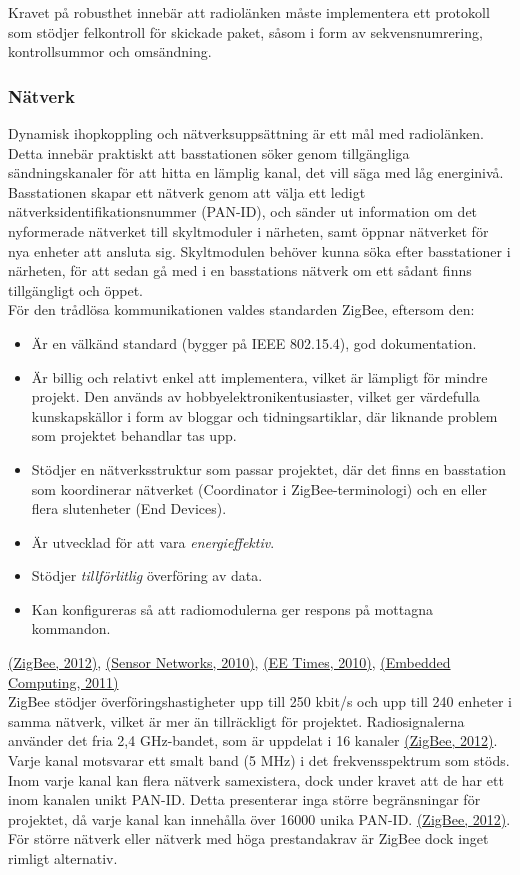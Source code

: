 \documentclass[a4paper,11pt]{article}
\begin{document}
Kravet på robusthet innebär att radiolänken måste implementera ett protokoll som stödjer felkontroll för skickade paket, såsom i form av sekvensnumrering, kontrollsummor och omsändning.

\subsubsection{Nätverk}
Dynamisk ihopkoppling och nätverksuppsättning är ett mål med radiolänken. Detta innebär praktiskt att basstationen söker genom tillgängliga sändningskanaler för att hitta en lämplig kanal, det vill säga med låg energinivå. Basstationen skapar ett nätverk genom att välja ett ledigt nätverksidentifikationsnummer (PAN-ID), och sänder ut information om det nyformerade nätverket till skyltmoduler i närheten, samt öppnar nätverket för nya enheter att ansluta sig. Skyltmodulen behöver kunna söka efter basstationer i närheten, för att sedan gå med i en basstations nätverk om ett sådant finns tillgängligt och öppet. \\

För den trådlösa kommunikationen valdes standarden ZigBee, eftersom den:
	
	\begin{itemize}
    	\item Är en välkänd standard (bygger på IEEE 802.15.4), god dokumentation.
    	\item Är billig och relativt enkel att implementera, vilket är lämpligt för mindre projekt. Den används av hobbyelektronikentusiaster, vilket ger värdefulla kunskapskällor i form av bloggar och tidningsartiklar, där liknande problem som projektet behandlar tas upp.
    	\item Stödjer en nätverksstruktur som passar projektet, där det finns en basstation som koordinerar nätverket (Coordinator i ZigBee-terminologi) och en eller flera slutenheter (End Devices).
    	\item Är utvecklad för att vara {\it energieffektiv}.
    	\item Stödjer {\it tillförlitlig} överföring av data.
    	\item Kan konfigureras så att radiomodulerna ger respons på mottagna kommandon.
    	\end{itemize}
\hyperref[zigbee]{(ZigBee, 2012)}, \hyperref[sensornetworks]{(Sensor Networks, 2010)}, \hyperref[eetimes]{(EE Times, 2010)}, \hyperref[embedded]{(Embedded Computing, 2011)}\\
    	
ZigBee stödjer överföringshastigheter upp till 250 kbit/s och upp till 240 enheter i samma nätverk, vilket är mer än tillräckligt för projektet. Radiosignalerna använder det fria 2,4 GHz-bandet, som är uppdelat i 16 kanaler \hyperref[zigbee]{(ZigBee, 2012)}. Varje kanal motsvarar ett smalt band (5 MHz) i det frekvensspektrum som stöds. Inom varje kanal kan flera nätverk samexistera, dock under kravet att de har ett inom kanalen unikt PAN-ID. Detta presenterar inga större begränsningar för projektet, då varje kanal kan innehålla över 16000 unika PAN-ID. \hyperref[zigbee]{(ZigBee, 2012)}. För större nätverk eller nätverk med höga prestandakrav är ZigBee dock inget rimligt alternativ. \\
\end{document}
